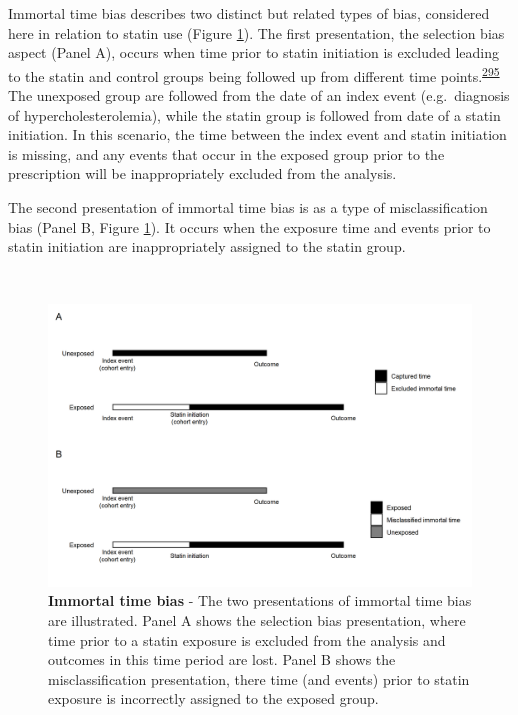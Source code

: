 \documentclass[a4paper, twoside]{templates/ociamthesis}
\begin{document}
Immortal time bias describes two distinct but related types of bias, considered here in relation to statin use (Figure \ref{fig:immortalTimeBias}). The first presentation, the selection bias aspect (Panel A), occurs when time prior to statin initiation is excluded leading to the statin and control groups being followed up from different time points.\textsuperscript{\protect\hyperlink{ref-levesque2010}{295}} The unexposed group are followed from the date of an index event (e.g.~diagnosis of hypercholesterolemia), while the statin group is followed from date of a statin initiation. In this scenario, the time between the index event and statin initiation is missing, and any events that occur in the exposed group prior to the prescription will be inappropriately excluded from the analysis.

The second presentation of immortal time bias is as a type of misclassification bias (Panel B, Figure \ref{fig:immortalTimeBias}). It occurs when the exposure time and events prior to statin initiation are inappropriately assigned to the statin group.

~





\begin{figure}[H]
\includegraphics[width=1\linewidth]{figures/cprd-analysis/immortal_time} \caption[Immortal time bias]{\textbf{Immortal time bias} - The two presentations of immortal time bias are illustrated. Panel A shows the selection bias presentation, where time prior to a statin exposure is excluded from the analysis and outcomes in this time period are lost. Panel B shows the misclassification presentation, there time (and events) prior to statin exposure is incorrectly assigned to the exposed group.}\label{fig:immortalTimeBias}
\end{figure}
\end{document}
